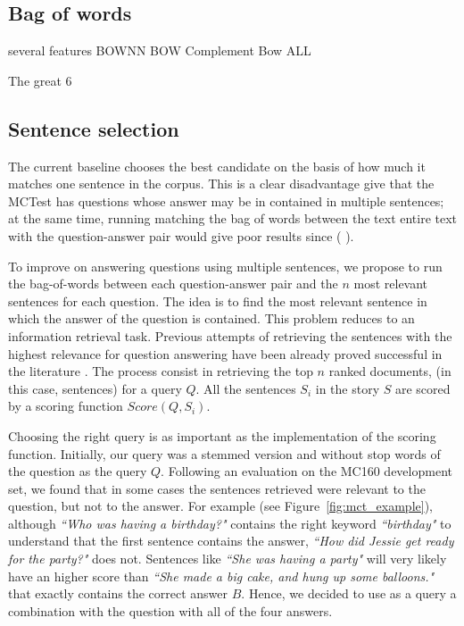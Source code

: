 \documentclass[11pt]{article}
\begin{document}
\subsection{Bag of words}
\label{sec:bagofwords}
several features
BOWNN
BOW Complement
Bow ALL

The great 6

\subsection{Sentence selection}
The current baseline chooses the best candidate on the basis of how much it matches one sentence in the corpus.
This is a clear disadvantage give that the MCTest has questions whose answer may be in contained in multiple sentences;
at the same time, running matching the bag of words between the text entire text with the question-answer pair would give poor results  since (%
).

To improve on answering questions using multiple sentences, we propose to run the bag-of-words between each question-answer pair and the $n$ most relevant sentences for each question.
The idea is to find the most relevant sentence in which the answer of the question is contained.
This problem reduces to an information retrieval task.
Previous attempts of retrieving the sentences with the highest relevance for question answering have been already proved successful in the literature \cite{qa_techniques,deep_selection}. %
The process consist in retrieving the top $n$ ranked documents, (in this case, sentences) for a query $Q$.
All the sentences $S_i$ in the story $S$ are scored by a scoring function $Score(Q, S_i)$.

Choosing the right query is as important as the implementation of the scoring function.
Initially, our query was a stemmed version and without stop words of the question as the query $Q$.
Following an evaluation on the MC160 development set, we found that in some cases the sentences retrieved were relevant to the question, but not to the answer.
For example (see Figure~\ref{fig:mct_example}), although {\em ``Who was having a birthday?"} contains the right keyword {\em ``birthday"} to understand that the first sentence contains the answer, {\em ``How did Jessie get ready for the party?"} does not.
Sentences like {\em ``She was having a party"} will very likely have an higher score than {\em ``She made a big cake, and hung up some balloons."} that exactly contains the correct answer $B$.
Hence, we decided to use as a query a combination with the question with all of the four answers.
\end{document}
